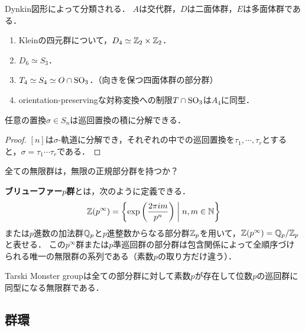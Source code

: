 \documentclass[uplatex,dvipdfmx]{jsreport}
\begin{document}
\begin{remark}
    Dynkin図形によって分類される．
    $A$は交代群，$D$は二面体群，$E$は多面体群である．
\end{remark}

\begin{proposition}\mbox{}
    \begin{enumerate}
        \item Kleinの四元群について，$D_4\simeq\mathbb{Z}_2\times\mathbb{Z}_2$．
        \item $D_6\simeq S_3$．
        \item $T_4\simeq S_4\simeq O\cap\mathrm{SO}_3$．（向きを保つ四面体群の部分群）
        \item orientation-preservingな対称変換への制限$T\cap\mathrm{SO}_3$は$A_4$に同型．
    \end{enumerate}
\end{proposition}

\begin{proposition}
    任意の置換$\sigma\in S_n$は巡回置換の積に分解できる．
\end{proposition}
\begin{proof}
    $[n]$は$\sigma$-軌道に分解でき，それぞれの中での巡回置換を$\tau_1,\cdots,\tau_r$とすると，$\sigma=\tau_1\cdots\tau_r$である．
\end{proof}

\begin{question}
    全ての無限群は，無限の正規部分群を持つか？
\end{question}
\begin{counterexample}\label{example-Prüfer-p-group}
    \textbf{ブリューファー$p$群}とは，次のように定義できる．
    \begin{align*}
        \mathbb{Z}(p^\infty) = \left\{\exp\left(\frac{2\pi im}{p^n}\right)\;\middle|\; n,m\in\mathbb{N}\right\}
    \end{align*}
    または$p$進数の加法群$\mathbb{Q}_p$と$p$進整数からなる部分群$\mathbb{Z}_p$を用いて，$\mathbb{Z}(p^\infty)=\mathbb{Q}_p/\mathbb{Z}_p$と表せる．
    この$p^\infty$群または$p$準巡回群の部分群は包含関係によって全順序づけられる唯一の無限群の系列である（素数$p$の取り方だけ違う）．
\end{counterexample}
\begin{counterexample}
    Tarski Monster groupは全ての部分群に対して素数$p$が存在して位数$p$の巡回群に同型になる無限群である．
\end{counterexample}

\subsection{群環}
\end{document}
